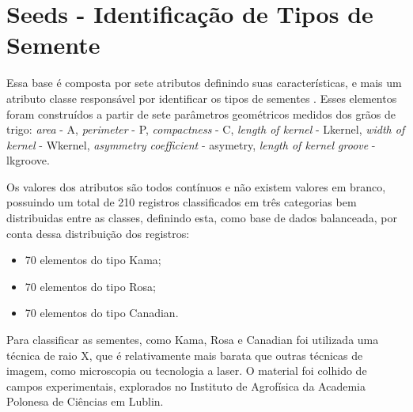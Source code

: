 



\section{Seeds - Identificação de Tipos de Semente}
Essa base é composta por sete  atributos definindo suas características, e mais um atributo classe  responsável por identificar os tipos de sementes \cite{Charytanowicz2010}. Esses elementos foram construídos a partir de sete parâmetros geométricos medidos dos grãos de trigo: \textit{area} - A, \textit{perimeter} - P, \textit{compactness} - C, \textit{length of kernel} - Lkernel, \textit{width of kernel} - Wkernel, \textit{asymmetry coefficient} - asymetry, \textit{length of kernel groove} - lkgroove.

Os valores dos atributos  são todos contínuos e não existem valores em branco,  possuindo um total de 210 registros classificados em três categorias bem distribuidas entre as classes, definindo esta, como base de dados balanceada, por conta dessa distribuição dos registros:
\begin{itemize}[noitemsep]
 \item 70 elementos do tipo Kama;
 \item 70 elementos do tipo Rosa;
 \item 70 elementos do tipo Canadian.
\end{itemize}
Para classificar as sementes, como Kama, Rosa e Canadian foi utilizada uma técnica de raio X, que é relativamente mais barata que outras técnicas de imagem, como microscopia ou tecnologia a laser. O material foi colhido de campos experimentais, explorados no Instituto de Agrofísica da Academia Polonesa de Ciências em Lublin.

